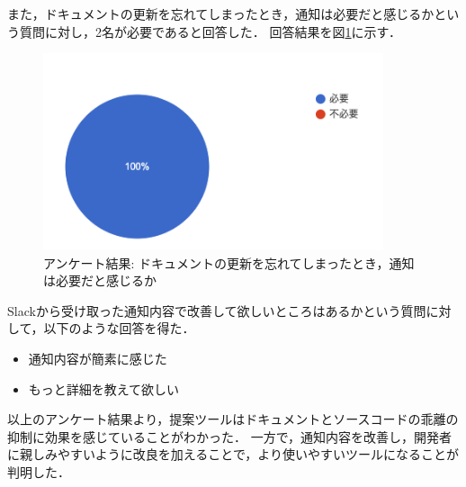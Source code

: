 また，ドキュメントの更新を忘れてしまったとき，通知は必要だと感じるかという質問に対し，2名が必要であると回答した．
回答結果を図\ref{q2}に示す．
\begin{figure}[H]
    \centering
    \includegraphics[width=10cm]{images/q2.png}
    \caption{アンケート結果: ドキュメントの更新を忘れてしまったとき，通知は必要だと感じるか}
    \label{q2}
\end{figure}

Slackから受け取った通知内容で改善して欲しいところはあるかという質問に対して，以下のような回答を得た．
\begin{itemize}
    \item 通知内容が簡素に感じた
    \item もっと詳細を教えて欲しい
\end{itemize}

以上のアンケート結果より，提案ツールはドキュメントとソースコードの乖離の抑制に効果を感じていることがわかった．
一方で，通知内容を改善し，開発者に親しみやすいように改良を加えることで，より使いやすいツールになることが判明した．
